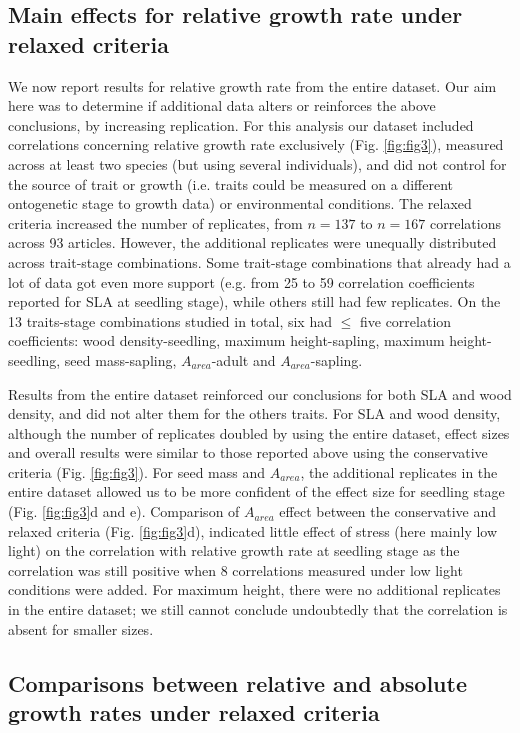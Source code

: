 \documentclass[a4paper,11pt]{article}
\begin{document}
\subsection*{Main effects for relative growth rate under relaxed criteria}

We now report results for relative growth rate from the entire dataset. Our aim here was to determine if additional data alters or reinforces the above conclusions, by increasing replication. For this analysis our dataset included correlations concerning relative growth rate exclusively (Fig. \ref{fig:fig3}), measured across at least two species (but using several individuals), and did not control for the source of trait or growth (i.e. traits could be measured on a different ontogenetic stage to growth data) or environmental conditions. The relaxed criteria increased the number of replicates, from $n = 137$ to $n = 167$ correlations across 93 articles. However, the additional replicates were unequally distributed across trait-stage combinations. Some trait-stage combinations that already had a lot of data got even more support (e.g. from 25 to 59 correlation coefficients reported for SLA at seedling stage), while others still had few replicates. On the 13 traits-stage combinations studied in total, six had $\le$ five correlation coefficients: wood density-seedling, maximum height-sapling, maximum height-seedling, seed mass-sapling, $A_{area}$-adult and $A_{area}$-sapling.

Results from the entire dataset reinforced our conclusions for both SLA and wood density, and did not alter them for the others traits. For SLA and wood density, although the number of replicates doubled by using the entire dataset, effect sizes and overall results were similar to those reported above using the conservative criteria (Fig. \ref{fig:fig3}). For seed mass and $A_{area}$, the additional replicates in the entire dataset allowed us to be more confident of the effect size for seedling stage (Fig. \ref{fig:fig3}d and e). Comparison of $A_{area}$ effect between the conservative and relaxed criteria (Fig. \ref{fig:fig3}d), indicated little effect of stress (here mainly low light) on the correlation with relative growth rate at seedling stage as the correlation was still positive when 8 correlations measured under low light conditions were added. For maximum height, there were no additional replicates in the entire dataset; we still cannot conclude undoubtedly that the correlation is absent for smaller sizes.

\subsection*{Comparisons between relative and absolute growth rates under relaxed criteria}
\end{document}
